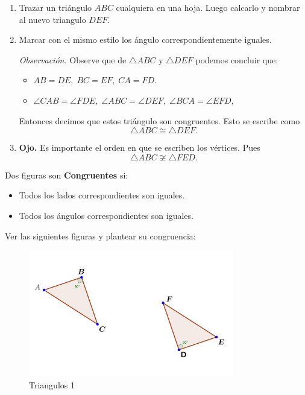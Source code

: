 \begin{enumerate}
	\item Trazar un triángulo $ABC$ cualquiera en una hoja. Luego calcarlo y nombrar al nuevo triangulo $DEF$.
	\item Marcar con el mismo estilo los ángulo correspondientemente iguales.
	
	\textit{Observación.} Observe que de $\triangle ABC$ y $\triangle DEF$ podemos concluir que:
	\begin{itemize}
		\item $AB=DE,\; BC=EF,\; CA=FD$.
		\item $\angle CAB = \angle FDE,\; \angle ABC = \angle DEF,\; \angle BCA = \angle EFD,\; $
	\end{itemize}
	
	Entonces decimos que estos triángulo son congruentes. Esto se escribe como $$\triangle ABC \cong \triangle DEF.$$
	\item \textbf{Ojo.} Es importante el orden en que se escriben los vértices. Pues $$\triangle ABC \not \cong \triangle FED.$$
\end{enumerate}

\begin{defi}
	Dos figuras son \textbf{Congruentes} si:
	\begin{itemize}
		\item Todos los lados correspondientes son iguales.
		\item Todos los ángulos correspondientes son iguales.
	\end{itemize}
\end{defi}

Ver las siguientes figuras y plantear su congruencia:

\begin{figure}[H]
	\centering
	\includegraphics[width=0.8\textwidth]{Geometria/imgs/DEFI CONGRUENTES EJEMPLO1.JPG}
	\caption{Triangulos 1}
	\label{defi.congruencia.fig1}
\end{figure}
